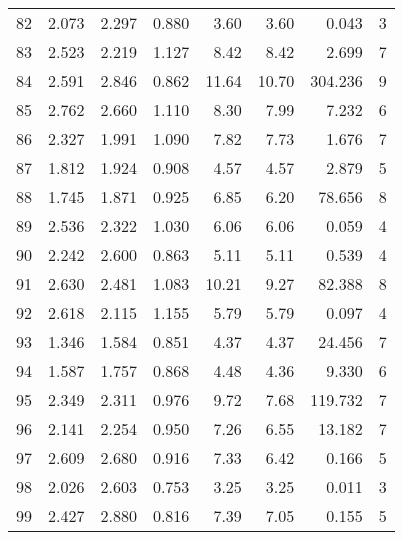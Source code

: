 \begin{tabular}{lrrrrrrr}
82 &     2.073 &      2.297 &      0.880 &    3.60 &     3.60 &    0.043 &        3 \\
83 &     2.523 &      2.219 &      1.127 &    8.42 &     8.42 &    2.699 &        7 \\
84 &     2.591 &      2.846 &      0.862 &   11.64 &    10.70 &  304.236 &        9 \\
85 &     2.762 &      2.660 &      1.110 &    8.30 &     7.99 &    7.232 &        6 \\
86 &     2.327 &      1.991 &      1.090 &    7.82 &     7.73 &    1.676 &        7 \\
87 &     1.812 &      1.924 &      0.908 &    4.57 &     4.57 &    2.879 &        5 \\
88 &     1.745 &      1.871 &      0.925 &    6.85 &     6.20 &   78.656 &        8 \\
89 &     2.536 &      2.322 &      1.030 &    6.06 &     6.06 &    0.059 &        4 \\
90 &     2.242 &      2.600 &      0.863 &    5.11 &     5.11 &    0.539 &        4 \\
91 &     2.630 &      2.481 &      1.083 &   10.21 &     9.27 &   82.388 &        8 \\
92 &     2.618 &      2.115 &      1.155 &    5.79 &     5.79 &    0.097 &        4 \\
93 &     1.346 &      1.584 &      0.851 &    4.37 &     4.37 &   24.456 &        7 \\
94 &     1.587 &      1.757 &      0.868 &    4.48 &     4.36 &    9.330 &        6 \\
95 &     2.349 &      2.311 &      0.976 &    9.72 &     7.68 &  119.732 &        7 \\
96 &     2.141 &      2.254 &      0.950 &    7.26 &     6.55 &   13.182 &        7 \\
97 &     2.609 &      2.680 &      0.916 &    7.33 &     6.42 &    0.166 &        5 \\
98 &     2.026 &      2.603 &      0.753 &    3.25 &     3.25 &    0.011 &        3 \\
99 &     2.427 &      2.880 &      0.816 &    7.39 &     7.05 &    0.155 &        5 \\
\bottomrule
\end{tabular}
